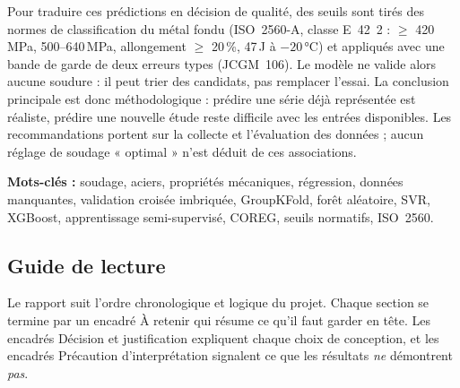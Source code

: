 Pour traduire ces prédictions en décision de qualité, des seuils sont tirés des
normes de classification du métal fondu (ISO~2560-A, classe E~42~2 : \YS{} $\geq$
420\,MPa, \UTS{} 500--640\,MPa, allongement $\geq$ 20\,\%, 47\,J à $-20$\,°C)
et appliqués avec une bande de garde de deux erreurs types (JCGM~106). Le modèle
ne valide alors aucune soudure : il peut trier des candidats, pas remplacer
l'essai. La conclusion principale est donc méthodologique : prédire une série
déjà représentée est réaliste, prédire une nouvelle étude reste difficile avec
les entrées disponibles. Les recommandations portent sur la collecte et
l'évaluation des données ; aucun réglage de soudage « optimal » n'est déduit de
ces associations.

\medskip
\noindent\textbf{Mots-clés :} soudage, aciers, propriétés mécaniques, régression,
données manquantes, validation croisée imbriquée, GroupKFold, forêt aléatoire,
SVR, XGBoost, apprentissage semi-supervisé, COREG, seuils normatifs, ISO~2560.

\subsection*{Guide de lecture}

Le rapport suit l'ordre chronologique et logique du projet. Chaque section se
termine par un encadré \og À retenir \fg{} qui résume ce qu'il faut garder en tête.
Les encadrés \og Décision et justification \fg{} expliquent chaque choix de
conception, et les encadrés \og Précaution d'interprétation \fg{} signalent ce
que les résultats \emph{ne} démontrent \emph{pas}.

